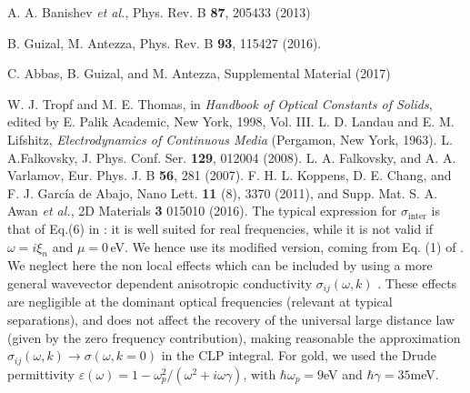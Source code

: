 \documentclass[aps,pra,superscriptaddress,amsmath,amssymb,showpacs,twocolumn,notitlepage]{revtex4-1}
\begin{document}
\begin{thebibliography}{100}
 A. A. Banishev \emph{et al.}, Phys. Rev. B {\bf 87}, 205433 (2013)

 B. Guizal, M. Antezza, Phys. Rev. B {\bf 93}, 115427 (2016).

 C. Abbas, B. Guizal, and M. Antezza, Supplemental Material (2017)

 W. J. Tropf and M. E. Thomas, in \emph{Handbook of Optical Constants of Solids}, edited by E. Palik Academic, New York, 1998, Vol. III.
 L. D. Landau and E. M. Lifshitz, \emph{Electrodynamics of Continuous Media} (Pergamon, New York, 1963).
 L. A.Falkovsky, J. Phys. Conf. Ser. {\bf 129}, 012004 (2008). 
 L. A. Falkovsky, and A. A. Varlamov, Eur. Phys. J. B {\bf 56}, 281 (2007).
 F. H. L. Koppens, D. E. Chang, and F. J. Garc\'{i}a de Abajo, Nano Lett. {\bf 11} (8), 3370 (2011), and Supp. Mat. 
 S. A. Awan \emph{et al.}, 2D Materials {\bf 3} 015010 (2016).
The typical expression for  $\sigma_\textrm{inter}$ is that of Eq.(6) in \cite{Falkovsky2008}: it is well suited for real frequencies, while it is not valid if $\omega=i\xi_n$ and $\mu=0\,$eV. We hence use  its modified version, coming from Eq. (1) of \cite{Falkovsky2008}.
{We neglect here the non local effects which can be included by using a more general wavevector dependent anisotropic conductivity  $\sigma_{ij}(\omega,k)$ \cite{Falkovsky2007}. These effects are negligible at the dominant optical frequencies (relevant at typical separations), and does not affect the recovery of the universal large distance law (given by the zero frequency contribution), making reasonable the approximation $\sigma_{ij}(\omega,k)\rightarrow \sigma(\omega,k=0)$ in the CLP integral.}
 For gold, we used the Drude permittivity $\varepsilon(\omega)=1-\omega_p^2/(\omega^2+i\omega\gamma)$, with $\hbar\omega_p=9$eV and $\hbar\gamma=35$meV. 

















\end{thebibliography}
\end{document}
